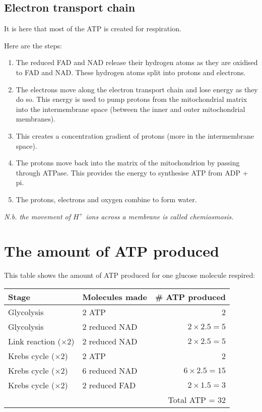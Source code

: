 \documentclass{article}
\begin{document}
\subsection*{Electron transport chain}
It is here that most of the ATP is created for respiration.

Here are the steps:
\begin{enumerate}
	\item The reduced FAD and NAD release their hydrogen atoms as they are
	oxidised to FAD and NAD. These hydrogen atoms split into protons and
	electrons.
	\item The electrons move along the electron transport chain and lose energy
	as they do so. This energy is used to pump protons from the mitochondrial
	matrix into the intermembrane space (between the inner and outer
	mitochondrial membranes).
	\item This creates a concentration gradient of protons (more in the
	intermembrane space).
	\item The protons move back into the matrix of the mitochondrion by passing
	through ATPase. This provides the energy to synthesise ATP from ADP + pi.
	\item The protons, electrons and oxygen combine to form water.
\end{enumerate}

\textit{N.b. the movement of $H^+$ ions across a membrane is called
chemiosmosis.}

\section*{The amount of ATP produced}
This table shows the amount of ATP produced for one glucose molecule respired:

\begin{center}
	\begin{tabular}{|l|l|r|}
		\hline
			Stage & Molecules made & \# ATP produced\\ \hline
			Glycolysis & 2 ATP & 2\\ \hline
			Glycolysis & 2 reduced NAD & $2 \times 2.5 = 5$\\ \hline
			Link reaction ($\times 2$) & 2 reduced NAD & $2 \times 2.5 = 5$\\
			\hline
			Krebs cycle ($\times 2$) & 2 ATP & 2\\ \hline
			Krebs cycle ($\times 2$) & 6 reduced NAD & $6 \times 2.5 = 15$\\
			\hline
			Krebs cycle ($\times 2$) & 2 reduced FAD & $2 \times 1.5 = 3$\\
			\hline
			\multicolumn{3}{|r|}{Total ATP = 32}\\ \hline
	\end{tabular}
\end{center}
\end{document}
